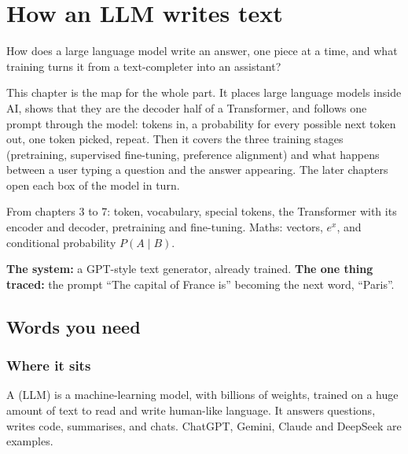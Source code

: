 \chapter{How an LLM writes text}
\label{ch:llm}

\begin{question}
How does a large language model write an answer, one piece at a time, and what training turns it from a text-completer into an assistant?
\end{question}

\begin{whatfor}
This chapter is the map for the whole part. It places large language models inside AI, shows that they are the decoder half of a Transformer, and follows one prompt through the model: tokens in, a probability for every possible next token out, one token picked, repeat. Then it covers the three training stages (pretraining, supervised fine-tuning, preference alignment) and what happens between a user typing a question and the answer appearing. The later chapters open each box of the model in turn.
\end{whatfor}

\begin{prereq}
From chapters 3 to 7: token, vocabulary, special tokens, the Transformer with its encoder and decoder, pretraining and fine-tuning. Maths: vectors, $e^x$, and conditional probability $P(A \mid B)$.
\end{prereq}

\begin{setup}
\textbf{The system:} a GPT-style text generator, already trained.
\textbf{The one thing traced:} the prompt ``The capital of France is'' becoming the next word, ``Paris''.
\end{setup}

\section{Words you need}

\subsection*{Where it sits}

\begin{definition}
A  (LLM) is a machine-learning model, with billions of weights, trained on a huge amount of text to read and write human-like language. It answers questions, writes code, summarises, and chats. ChatGPT, Gemini, Claude and DeepSeek are examples.
\end{definition}

